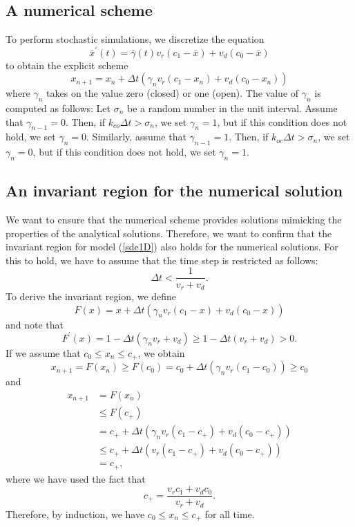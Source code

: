 \subsection{A numerical scheme \label{numscheme}}

To perform stochastic simulations, we discretize the equation%
\begin{equation}
\bar{x}^{\prime}(t)=\bar{\gamma}(t)v_{r}(c_{1}-\bar{x})+v_{d}(c_{0}-\bar{x}) \label{sde1D}
\end{equation}
to obtain the explicit scheme%
\begin{equation}
x_{n+1}=x_{n}+\Delta t\left( \gamma_{n}v_{r}(c_{1}-x_{n})+v_{d}(c_{0}%
-x_{n})\right) \label{sde1D_scheme}
\end{equation}
where $\gamma_{n}$ takes on the value zero (closed) or one (open). The value of $\gamma_{n}$ is computed as follows: Let $\sigma_n$ be a random number in the unit interval. Assume that $\gamma_{n-1}=0$. Then, if $k_{co}\Delta t >\sigma_n$, we set 
$\gamma_{n}=1$, but if this condition does not hold, we set $\gamma_{n}=0$. Similarly, assume that $\gamma_{n-1}=1$. Then, if $k_{oc}\Delta t >\sigma_n$, we set 
$\gamma_{n}=0$, but if this condition does not hold, we set $\gamma_{n}=1$.

\subsection{An invariant region for the numerical solution}
We want to ensure that the numerical scheme provides solutions mimicking the properties of the analytical solutions. Therefore, we want to confirm that the invariant region for model (\ref{sde1D}) also holds for the numerical solutions. For this to hold, we have to assume that the time step is restricted as follows:
\begin{equation}
\Delta t<\frac{1}{v_{r}+v_{d}}. \label{time_step_sode}%
\end{equation}
To derive the invariant region, we define
\[
F(x)=x+\Delta t\left(  \gamma_{n}v_{r}(c_{1}-x)+v_{d}(c_{0}-x)\right)
\]
and note that
\[
F^{\prime}(x)=1-\Delta t\left(  \gamma_{n}v_{r}+v_{d}\right)  \geqslant
1-\Delta t\left(  v_{r}+v_{d}\right)  >0.
\]
If we assume that $c_{0}\leqslant x_{n}\leqslant c_{+}$, we obtain%
\[
x_{n+1}=F(x_{n})\geqslant F(c_{0})=c_{0}+\Delta t\left(  \gamma_{n}v_{r}%
(c_{1}-c_{0})\right)  \geqslant c_{0}%
\]
and%
\begin{align*}
x_{n+1}  &  =F(x_{n})\\
&\leqslant F(c_{+})\\
&  =c_{+}+\Delta t\left(  \gamma_{n}v_{r}(c_{1}-c_{+})+v_{d}(c_{0}%
-c_{+})\right) \\
&  \leqslant c_{+}+\Delta t\left(  v_{r}(c_{1}-c_{+})+v_{d}(c_{0}%
-c_{+})\right) \\
&  =c_{+},%
\end{align*}
where we have used the fact that
\[ c_{+}=\frac{v_{r}c_{1}+v_{d}c_{0}}{v_{r}+v_{d}}.\]
Therefore, by induction, we have $c_{0}\leqslant x_{n}\leqslant c_{+}$ for all time.


